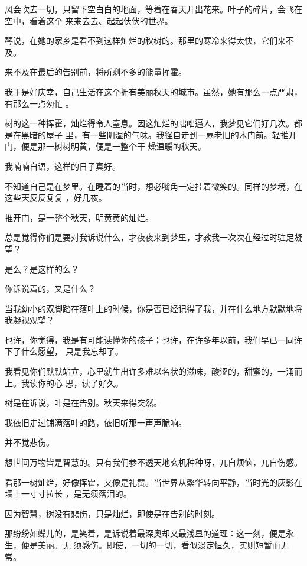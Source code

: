 \documentclass[12pt,a4paper]{article}
\begin{document}
		风会吹去一切，只留下空白白的地面，等着在春天开出花来。叶子的碎片，会飞在空中，看着这个
	来来去去、起起伏伏的世界。

		琴说，在她的家乡是看不到这样灿烂的秋树的。那里的寒冷来得太快，它们来不及。

		来不及在最后的告别前，将所剩不多的能量挥霍。

		我于是好庆幸，自己生活在这个拥有美丽秋天的城市。虽然，她有那么一点严肃，有那么一点匆忙
	。

		树的这一种挥霍，灿烂得令人窒息。因这灿烂的咄咄逼人，我梦见它们好几次。都是在黑暗的屋子
	里，有一些阴湿的气味。我径自走到一扇老旧的木门前。轻推开门，便是那一树树明黄，便是一整个干
	燥温暖的秋天。

		我喃喃自语，这样的日子真好。

		不知道自己是在梦里。在睡着的当时，想必嘴角一定挂着微笑的。同样的梦境，在这些天反反复复
	，好几夜。

		推开门，是一整个秋天，明黄黄的灿烂。

		总是觉得你们是要对我诉说什么，才夜夜来到梦里，才教我一次次在经过时驻足凝望？

		是么？是这样的么？

		你诉说着的，又是什么？

		当我幼小的双脚踏在落叶上的时候，你是否已经记得了我，并在什么地方默默地将我凝视观望？

		也许，你觉得，我是有可能读懂你的孩子；也许，在许多年以前，我们早已一同许下了什么愿望，
	只是我忘却了。

		我看见你们默默站立，心里就生出许多难以名状的滋味，酸涩的，甜蜜的，一涌而上。我读你的心
	思，读了好久。

		树是在诉说，叶是在告别。秋天来得突然。

		我依旧走过铺满落叶的路，依旧听那一声声脆响。

		并不觉悲伤。

		想世间万物皆是智慧的。只有我们参不透天地玄机种种呀，兀自烦恼，兀自伤感。

		看那一树灿烂，好像挥霍，又像是礼赞。当世界从繁华转向平静，当时光的灰影在墙上一寸寸拉长
	，是无须落泪的。

		因为智慧，树没有悲伤，只是灿烂，即使是在告别的时刻。

		那纷纷如蝶儿的，是笑着，是诉说着最深奥却又最浅显的道理：这一刻，便是永生，便是美丽。无
	须感伤。即使，一切的一切，看似淡定恒久，实则短暂而无常。

	\endwriting


\end{document}
